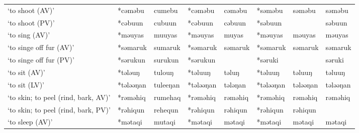 \begin{landscape}
\begin{longtable}[c]{@{}p{3cm}<{\raggedright}p{2.75cm}<{\raggedright}p{2.75cm}<{\raggedright}p{2.75cm}<{\raggedright}p{2.75cm}<{\raggedright}p{2.75cm}<{\raggedright}p{2.75cm}<{\raggedright}p{2.75cm}<{\raggedright}@{}}
`to shoot (AV)'                                      & *cəməbu      & cumebu                        & *cəməbu        & cəməbu                     & *səməbu          & səməbu                   & səməbu                            \\
`to shoot (PV)'                                      & *cəbuun      & cubuun                        & *cəbuun        & cəbuun                     & *səbuun          &                          & səbuun                            \\
`to sing (AV)'                                       & *məuyas      & muuyas                        & *məuyas        & muyas                      & *məuyas          & məuyas                   & məuyas                            \\
`to singe off fur (AV)'                              & *səmaruk     & sumaruk                       & *səmaruk       & səmaruk                    & *səmaruk         & səmaruk                  & səmaruk                           \\
`to singe off fur (PV)'                              & *sərukun     & surukun                       & *sərukun       &                            & *səruki          &                          & səruki                            \\
`to sit (AV)'                                        & *tələuŋ      & tulouŋ                        & *təluuŋ        & təluŋ                      & *təluuŋ          & təluuŋ                   & təluuŋ                            \\
`to sit (LV)'                                        & *tələəŋan    & tuleeŋan                      & *tələəŋan      & tələŋan                    & *tələəŋan        & tələəŋan                 & tələəŋan                          \\
`to skin; to peel (rind, bark, AV)'                  & *rəməhiq     & rumehaq                       & *rəməhiq       & rəməhiq                    & *rəməhiq         & rəməhiq                  & rəməhiq                           \\
`to skin; to peel (rind, bark, PV)'                  & *rəhiqun     & rehequn                       & *rəhiqun       & rəhiqun                    & *rəhiqun         & rəhiqun                  &                                   \\
`to sleep (AV)'                                      & *mətaqi      & mutaqi                        & *mətaqi        & mətaqi                     & *mətaqi          & mətaqi                   & mətaqi                            \\

\end{longtable}
\end{landscape}

